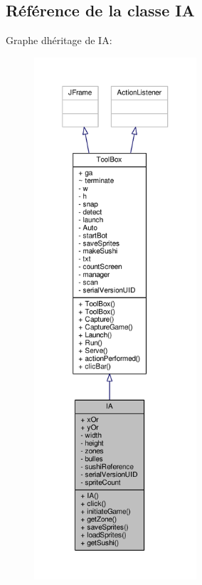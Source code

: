 \hypertarget{classIA}{}\subsection{Référence de la classe I\+A}
\label{classIA}


Graphe d\textquotesingle{}héritage de I\+A\+:\nopagebreak
\begin{figure}[H]
\begin{center}
\leavevmode
\includegraphics[height=550pt]{classIA__inherit__graph}
\end{center}
\end{figure}


